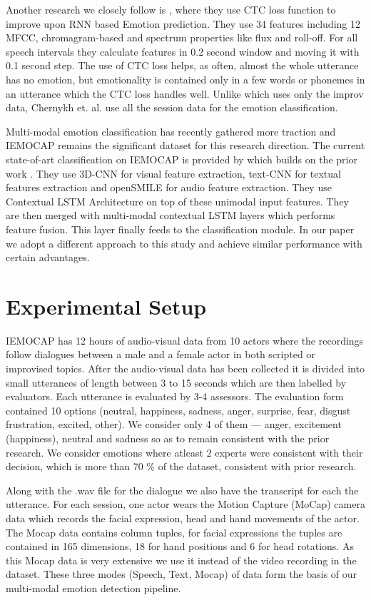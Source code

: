 \documentclass{article}
\begin{document}
Another research we closely follow is \cite{Chernykh}, where they use CTC loss function to improve upon RNN based Emotion prediction. They use 34 features including 12 MFCC, chromagram-based and spectrum properties like flux and roll-off. For all speech intervals they calculate features in 0.2 second window and moving it with 0.1 second step. The use of CTC loss helps, as often, almost the whole utterance has no emotion, but emotionality is contained only in a few words or phonemes in an utterance which the CTC loss handles well. Unlike \cite{Lee} which uses only the improv data, Chernykh et. al. use all the session data for the emotion classification. 

Multi-modal emotion classification has recently gathered more traction and IEMOCAP remains the significant dataset for this research direction. The current state-of-art classification on IEMOCAP is provided by \cite{poria2018multimodal} which builds on the prior work \cite{poria2017context}. They use  3D-CNN for visual feature extraction, text-CNN for textual features extraction and openSMILE for audio feature extraction. They use Contextual LSTM Architecture on top of these unimodal input features. They are then merged with multi-modal contextual LSTM layers which performs feature fusion. This layer finally feeds to the classification module. In our paper we adopt a different approach to this study and achieve similar performance with certain advantages.   

\section{Experimental Setup}
\label{sec:RW}

IEMOCAP has 12 hours of audio-visual data from 10 actors where the recordings follow dialogues between a male and a female actor in both scripted or improvised topics. After the audio-visual data has been collected it is divided into small utterances of length between 3 to 15 seconds which are then labelled by evaluators. Each utterance is evaluated by 3-4 assessors. The evaluation form contained 10 options (neutral, happiness, sadness, anger, surprise, fear, disgust frustration, excited, other). We consider only 4 of them — anger, excitement (happiness), neutral and sadness so as to remain consistent with the prior research. We consider emotions where atleast 2 experts were consistent with their decision, which is more than 70 \% of the dataset, consistent with prior research.

Along with the .wav file for the dialogue we also have the transcript for each the utterance. For each session, one actor wears the Motion Capture (MoCap) camera data which records the facial expression, head and hand movements of the actor. The Mocap data contains column tuples, for facial expressions the tuples are contained in 165 dimensions, 18 for hand positions and 6 for head rotations. As this Mocap data is very extensive we use it instead of the video recording in the dataset. These three modes (Speech, Text, Mocap) of data form the basis of our multi-modal emotion detection pipeline. 
\end{document}
